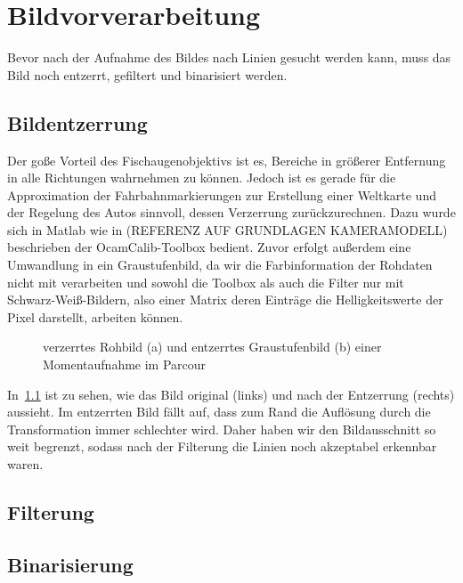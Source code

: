 \chapter{Bildvorverarbeitung}

Bevor nach der Aufnahme des Bildes nach Linien gesucht werden kann, muss das Bild noch entzerrt, gefiltert und binarisiert werden. 

\section{Bildentzerrung}

Der goße Vorteil des Fischaugenobjektivs ist es, Bereiche in größerer Entfernung in alle Richtungen  wahrnehmen zu können. Jedoch ist es gerade für die Approximation der Fahrbahnmarkierungen zur Erstellung einer Weltkarte und der Regelung des Autos sinnvoll, dessen Verzerrung zurückzurechnen. Dazu wurde sich in Matlab wie in (REFERENZ AUF GRUNDLAGEN KAMERAMODELL) beschrieben der OcamCalib-Toolbox bedient. Zuvor erfolgt außerdem eine Umwandlung in ein Graustufenbild, da wir die Farbinformation der Rohdaten nicht mit verarbeiten und sowohl die Toolbox als auch die Filter nur mit Schwarz-Weiß-Bildern, also einer Matrix deren Einträge die Helligkeitswerte der Pixel darstellt, arbeiten können. 

\begin{figure}[H] %
  \centering
  \quad
  \caption{verzerrtes Rohbild (a) und entzerrtes Graustufenbild (b) einer Momentaufnahme im Parcour}
\label{fig:bildvorverarbeitung_entzerren}
\end{figure} 

In~\ref{fig:bildvorverarbeitung_entzerren} ist zu sehen, wie das Bild original (links) und nach der Entzerrung (rechts) aussieht. Im entzerrten Bild fällt auf, dass zum Rand die Auflösung durch die Transformation immer schlechter wird. Daher haben wir den Bildausschnitt so weit begrenzt, sodass nach der Filterung die Linien noch akzeptabel erkennbar waren.

\section{Filterung}




\section{Binarisierung}

